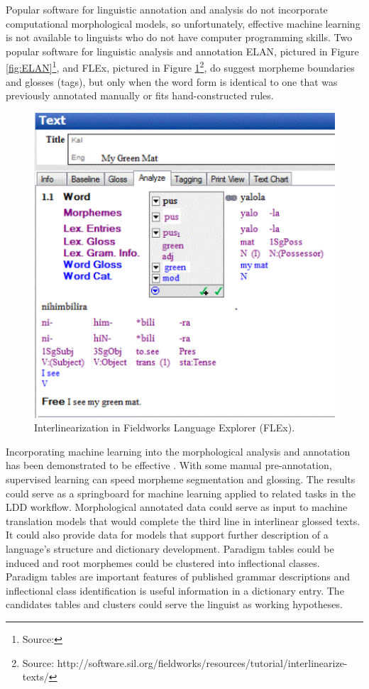 \documentclass[12pt]{article}
\begin{document}
Popular software for linguistic annotation and analysis do not incorporate computational morphological models, so unfortunately, effective machine learning is not available to linguists who do not have computer programming skills. Two popular software for linguistic analysis and annotation ELAN, pictured in Figure \ref{fig:ELAN}\footnote{Source: }, and FLEx, pictured in Figure \ref{fig:FLEX}\footnote{Source: http://software.sil.org/fieldworks/resources/tutorial/interlinearize-texts/}, do suggest morpheme boundaries and glosses (tags), but only when the word form is identical to one that was previously annotated manually or fits hand-constructed rules. 
\begin{figure}[ht]
\label{fig:FLEX}
\begin{center}
\includegraphics[width=0.40\columnwidth]{FLExIGT.png}
\caption{Interlinearization in Fieldworks Language Explorer (FLEx).}
\end{center}
\end{figure}

Incorporating machine learning into the morphological analysis and annotation has been demonstrated to be effective \cite{baldridge_how_2009,palmer_semi-automated_2009,palmer_evaluating_2009}. With some manual pre-annotation, supervised learning can speed morpheme segmentation and glossing. The results could serve as a springboard for machine learning applied to related tasks in the LDD workflow. Morphological annotated data could serve as input to machine translation models that would complete the third line in interlinear glossed texts. It could also provide data for models that support further description of a language's structure and dictionary development. Paradigm tables could be induced and root morphemes could be clustered into inflectional classes. Paradigm tables are important features of published grammar descriptions and inflectional class identification is useful information in a dictionary entry. The candidates tables and clusters could serve the linguist as working hypotheses.
\end{document}
